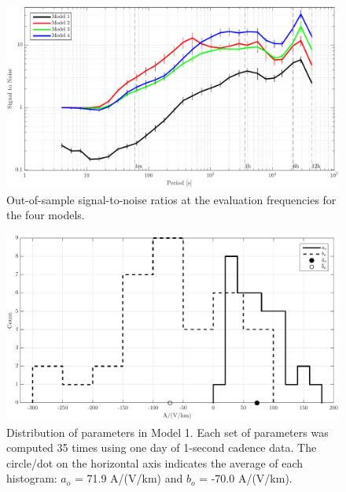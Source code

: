 \documentclass[draft,linenumbers]{agujournal2018}
\begin{document}
\begin{figure}[h]
\centering
\includegraphics[width=\textwidth]{figures/plot_model_summary_SN-options-1.pdf}
\caption{Out-of-sample signal-to-noise ratios at the evaluation frequencies for the four models.}
\label{SN}
\end{figure}

\begin{figure}[h]
\centering
\includegraphics[width=\textwidth]{figures/plot_model_summary_aobo_histograms-options-1.pdf}
\caption{Distribution of parameters in Model 1. Each set of parameters was computed 35 times using one day of 1-second cadence data. The circle/dot on the horizontal axis indicates the average of each histogram: $a_o$ = 71.9 A/(V/km) and $b_o$ = -70.0 A/(V/km).}
\label{histogram}
\end{figure}
\end{document}
